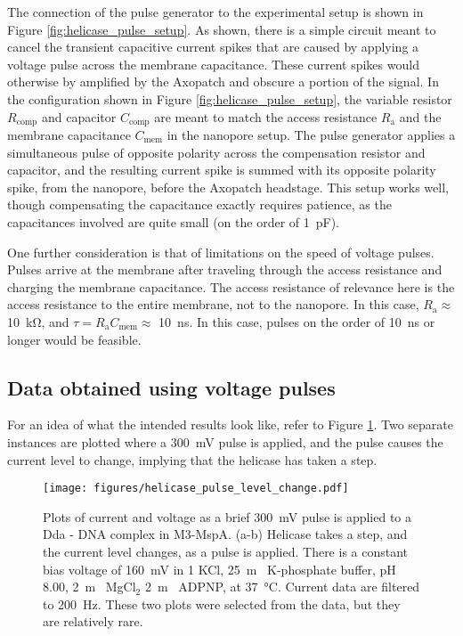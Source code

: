 The connection of the pulse generator to the experimental setup is shown in Figure \ref{fig:helicase_pulse_setup}.  As shown, there is a simple circuit meant to cancel the transient capacitive current spikes that are caused by applying a voltage pulse across the membrane capacitance.  These current spikes would otherwise by amplified by the Axopatch and obscure a portion of the signal.  In the configuration shown in Figure \ref{fig:helicase_pulse_setup}, the variable resistor $R_{\text{comp}}$ and capacitor $C_{\text{comp}}$ are meant to match the access resistance $R_{\text{a}}$ and the membrane capacitance $C_{\text{mem}}$ in the nanopore setup.  The pulse generator applies a simultaneous pulse of opposite polarity across the compensation resistor and capacitor, and the resulting current spike is summed with its opposite polarity spike, from the nanopore, before the Axopatch headstage.  This setup works well, though compensating the capacitance exactly requires patience, as the capacitances involved are quite small (on the order of \SI{1}{\pico\F}).

One further consideration is that of limitations on the speed of voltage pulses.  Pulses arrive at the membrane after traveling through the access resistance and charging the membrane capacitance.  The access resistance of relevance here is the access resistance to the entire membrane, not to the nanopore.  In this case, $R_{\text{a}} \approx $ \SI{10}{\kilo\ohm}, and $\tau = R_{\text{a}} C_{\text{mem}} \approx $ \SI{10}{\ns}.  In this case, pulses on the order of \SI{10}{\ns} or longer would be feasible.

\subsection{Data obtained using voltage pulses}

For an idea of what the intended results look like, refer to Figure \ref{fig:helicase_pulse}.  Two separate instances are plotted where a \SI{300}{\mV} pulse is applied, and the pulse causes the current level to change, implying that the helicase has taken a step.

\begin{figure}[h]
\begin{centering}
\texttt{[image: figures/helicase\_pulse\_level\_change.pdf]}
\caption[Voltage pulse can induce a helicase step]{Plots of current and voltage as a brief \SI{300}{\mV} pulse is applied to a Dda - DNA complex in  M3-MspA.  (a-b) Helicase takes a step, and the current level changes, as a pulse is applied.  There is a constant bias voltage of \SI{160}{\mV} in \SI{1}{\Molar} KCl, \SI{25}{\m\Molar} K-phosphate buffer, pH \num{8.00}, \SI{2}{\m\Molar} MgCl$_2$ \SI{2}{\m\Molar} ADPNP, at \SI{37}{\celsius}.  Current data are filtered to \SI{200}{\Hz}.  These two plots were selected from the data, but they are relatively rare.}
\label{fig:helicase_pulse}
\end{centering}
\end{figure}

